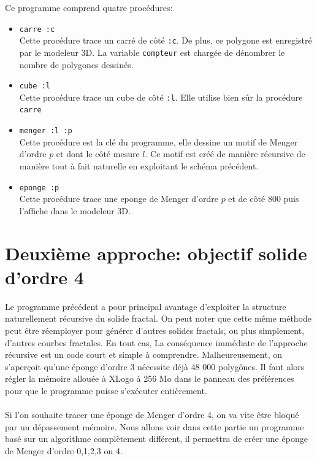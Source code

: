Ce programme comprend quatre procédures:
\begin{itemize}
 \item \texttt{carre :c}\\
Cette procédure trace un carré de côté \texttt{:c}. De plus, ce polygone est enregistré par le modeleur 3D. La variable \texttt{compteur} est chargée de dénombrer le nombre de polygones dessinés.
 \item \texttt{cube :l}\\
Cette procédure trace un cube de côté \texttt{:l}. Elle utilise bien sûr la procédure \texttt{carre}
 \item \texttt{menger :l :p}\\
Cette procédure est la clé du programme, elle dessine un motif de Menger d'ordre $p$ et dont le côté mesure $l$. Ce motif est créé de manière récursive de manière tout à fait naturelle en exploitant le schéma précédent.
 \item \texttt{eponge :p}\\
Cette procédure trace une eponge de Menger d'ordre $p$ et de côté 800 puis l'affiche dans le modeleur 3D.
\end{itemize}
\vfill
\pagebreak
\section{Deuxième approche: objectif solide d'ordre 4}
Le programme précédent a pour principal avantage d'exploiter la structure naturellement récursive du solide fractal. On peut noter que cette même méthode peut être réemployer pour générer d'autres solides fractals, ou plus simplement, d'autres courbes fractales. En tout cas, La conséquence immédiate de l'approche récursive est un code court et simple à comprendre. Malheureusement, on s'aperçoit qu'une éponge d'ordre 3 nécessite déjà 48 000 polygônes. Il faut alors régler la mémoire allouée à XLogo à 256 Mo dans le panneau des préférences pour que le programme puisse s'exécuter entièrement. \\ \\
Si l'on souhaite tracer une éponge de Menger d'ordre 4, on va vite être bloqué par un dépassement mémoire. Nous allons voir dans cette partie un programme basé sur un algorithme complètement différent, il permettra de créer une éponge de Menger d'ordre 0,1,2,3 ou 4.
